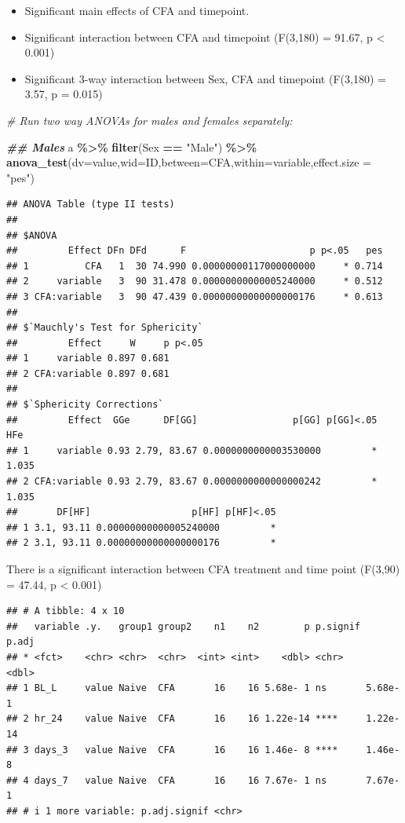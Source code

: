 \documentclass[
]{book}
\newenvironment{Shaded}{\begin{snugshade}}{\end{snugshade}}
\newcommand{\AttributeTok}[1]{\textcolor[rgb]{0.13,0.29,0.53}{#1}}
\newcommand{\CommentTok}[1]{\textcolor[rgb]{0.56,0.35,0.01}{\textit{#1}}}
\newcommand{\DocumentationTok}[1]{\textcolor[rgb]{0.56,0.35,0.01}{\textbf{\textit{#1}}}}
\newcommand{\FunctionTok}[1]{\textcolor[rgb]{0.13,0.29,0.53}{\textbf{#1}}}
\newcommand{\NormalTok}[1]{#1}
\newcommand{\SpecialCharTok}[1]{\textcolor[rgb]{0.81,0.36,0.00}{\textbf{#1}}}
\newcommand{\StringTok}[1]{\textcolor[rgb]{0.31,0.60,0.02}{#1}}
\begin{document}
\begin{itemize}
\item
  Significant main effects of CFA and timepoint.
\item
  Significant interaction between CFA and timepoint (F(3,180) = 91.67, p \textless{} 0.001)
\item
  Significant 3-way interaction between Sex, CFA and timepoint (F(3,180) = 3.57, p = 0.015)
\end{itemize}

\begin{Shaded}
\begin{Highlighting}[]
\CommentTok{\# Run two way ANOVAs for males and females separately: }

\DocumentationTok{\#\# Males}
\NormalTok{a }\SpecialCharTok{\%\textgreater{}\%}
  \FunctionTok{filter}\NormalTok{(Sex }\SpecialCharTok{==} \StringTok{"Male"}\NormalTok{) }\SpecialCharTok{\%\textgreater{}\%}
  \FunctionTok{anova\_test}\NormalTok{(}\AttributeTok{dv=}\NormalTok{value,}\AttributeTok{wid=}\NormalTok{ID,}\AttributeTok{between=}\NormalTok{CFA,}\AttributeTok{within=}\NormalTok{variable,}\AttributeTok{effect.size =} \StringTok{"pes"}\NormalTok{)}
\end{Highlighting}
\end{Shaded}

\begin{verbatim}
## ANOVA Table (type II tests)
## 
## $ANOVA
##         Effect DFn DFd      F                      p p<.05   pes
## 1          CFA   1  30 74.990 0.00000000117000000000     * 0.714
## 2     variable   3  90 31.478 0.00000000000005240000     * 0.512
## 3 CFA:variable   3  90 47.439 0.00000000000000000176     * 0.613
## 
## $`Mauchly's Test for Sphericity`
##         Effect     W     p p<.05
## 1     variable 0.897 0.681      
## 2 CFA:variable 0.897 0.681      
## 
## $`Sphericity Corrections`
##         Effect  GGe      DF[GG]                 p[GG] p[GG]<.05   HFe
## 1     variable 0.93 2.79, 83.67 0.0000000000003530000         * 1.035
## 2 CFA:variable 0.93 2.79, 83.67 0.0000000000000000242         * 1.035
##       DF[HF]                  p[HF] p[HF]<.05
## 1 3.1, 93.11 0.00000000000005240000         *
## 2 3.1, 93.11 0.00000000000000000176         *
\end{verbatim}

There is a significant interaction between CFA treatment and time point (F(3,90) = 47.44, p \textless{} 0.001)

\begin{verbatim}
## # A tibble: 4 x 10
##   variable .y.   group1 group2    n1    n2        p p.signif    p.adj
## * <fct>    <chr> <chr>  <chr>  <int> <int>    <dbl> <chr>       <dbl>
## 1 BL_L     value Naive  CFA       16    16 5.68e- 1 ns       5.68e- 1
## 2 hr_24    value Naive  CFA       16    16 1.22e-14 ****     1.22e-14
## 3 days_3   value Naive  CFA       16    16 1.46e- 8 ****     1.46e- 8
## 4 days_7   value Naive  CFA       16    16 7.67e- 1 ns       7.67e- 1
## # i 1 more variable: p.adj.signif <chr>
\end{verbatim}
\end{document}
